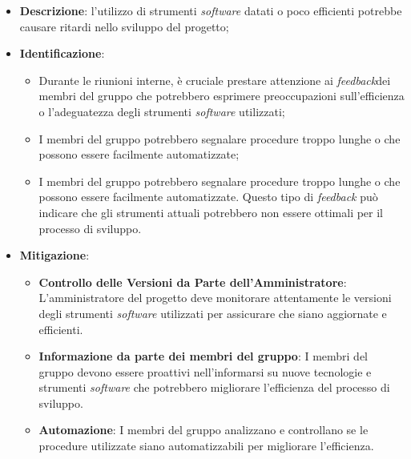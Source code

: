 \label{risk:strumenti software inadeguati}
\begin{itemize}
	\item \textbf{Descrizione}: l'utilizzo di strumenti \textit{software} datati o poco
	      efficienti potrebbe causare ritardi nello sviluppo del progetto;

	\item \textbf{Identificazione}:
	      \begin{itemize}
		      \item Durante le riunioni interne, è cruciale prestare attenzione 
			  		ai \textit{feedback}\g dei membri del gruppo che potrebbero esprimere 
					preoccupazioni sull'efficienza o l'adeguatezza degli strumenti \textit{software} utilizzati;

		      \item I membri del gruppo potrebbero segnalare procedure troppo lunghe o 
			  		che possono essere facilmente automatizzate;

		      \item I membri del gruppo potrebbero segnalare procedure troppo lunghe o 
			  		che possono essere facilmente automatizzate. 
					Questo tipo di \textit{feedback} può indicare che gli strumenti attuali 
					potrebbero non essere ottimali per il processo di sviluppo.
	      \end{itemize}

	\item \textbf{Mitigazione}:
	      \begin{itemize}

			\item \textbf{Controllo delle Versioni da Parte dell'Amministratore}: 
				L'amministratore del progetto deve monitorare attentamente le versioni 
				degli strumenti \textit{software} utilizzati per assicurare che siano aggiornate e efficienti.
				
			\item \textbf{Informazione da parte dei membri del gruppo}: 
				I membri del gruppo devono essere proattivi nell'informarsi su nuove tecnologie e 
				strumenti \textit{software} che potrebbero migliorare l'efficienza del processo di sviluppo.

			\item \textbf{Automazione}: 
				I membri del gruppo analizzano e controllano se le procedure utilizzate siano 
				automatizzabili per migliorare l'efficienza.
	      \end{itemize}
\end{itemize}
